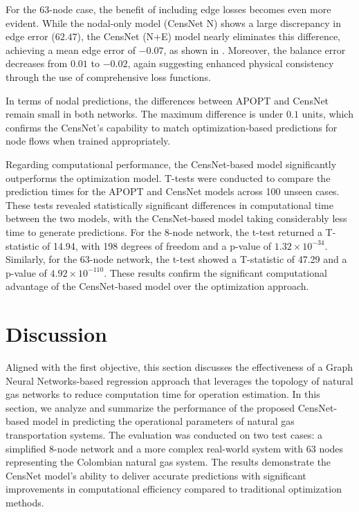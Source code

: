 For the 63-node case, the benefit of including edge losses becomes even more evident. While the nodal-only model (CensNet N) shows a large discrepancy in edge error (\(62.47\)), the CensNet (N+E) model nearly eliminates this difference, achieving a mean edge error of \(-0.07\), as shown in . Moreover, the balance error decreases from \(0.01\) to \(-0.02\), again suggesting enhanced physical consistency through the use of comprehensive loss functions.

In terms of nodal predictions, the differences between APOPT and CensNet remain small in both networks. The maximum difference is under \(0.1\) units, which confirms the CensNet's capability to match optimization-based predictions for node flows when trained appropriately.

Regarding computational performance, the CensNet-based model significantly outperforms the optimization model. T-tests were conducted to compare the prediction times for the APOPT and CensNet models across 100 unseen cases. These tests revealed statistically significant differences in computational time between the two models, with the CensNet-based model taking considerably less time to generate predictions. For the 8-node network, the t-test returned a T-statistic of 14.94, with 198 degrees of freedom and a p-value of $1.32 \times 10^{-34}$. Similarly, for the 63-node network, the t-test showed a T-statistic of 47.29 and a p-value of $4.92 \times 10^{-110}$. These results confirm the significant computational advantage of the CensNet-based model over the optimization approach.



\section{Discussion}

Aligned with the first objective, this section discusses the effectiveness of a Graph Neural Networks-based regression approach that leverages the topology of natural gas networks to reduce computation time for operation estimation. In this section, we analyze and summarize the performance of the proposed CensNet-based model in predicting the operational parameters of natural gas transportation systems. The evaluation was conducted on two test cases: a simplified 8-node network and a more complex real-world system with 63 nodes representing the Colombian natural gas system. The results demonstrate the CensNet model's ability to deliver accurate predictions with significant improvements in computational efficiency compared to traditional optimization methods.

